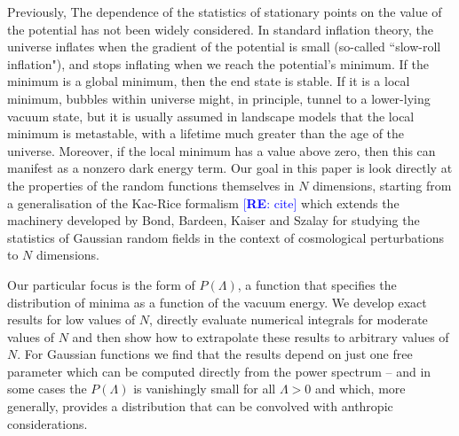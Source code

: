 \documentclass[12pt]{article}
\newcommand{\re}[1]{\textcolor{blue}{[{\bf RE}: #1]}}
\begin{document}




Previously, The dependence of the statistics of stationary points on the value of the potential has not been widely considered. In standard inflation theory, the universe inflates when the gradient of the potential is small (so-called ``slow-roll inflation"), and stops inflating when we reach the potential's minimum. If the minimum is a global minimum, then the end state is stable. If it is  a local minimum, bubbles within universe might, in principle,  tunnel to a lower-lying vacuum state, but it is usually assumed in landscape models that the local minimum is metastable, with a lifetime much greater than the age of the universe. Moreover, if the local minimum has a value above zero, then this can manifest as a nonzero dark energy term. Our goal in this paper is look directly at the properties of the random functions themselves in $N$ dimensions, starting from a generalisation of the Kac-Rice formalism \cite{Kac1943}\cite{Rice1945}\re{cite} which extends  the  machinery developed by Bond, Bardeen, Kaiser and Szalay for studying the statistics of Gaussian random fields in the context of cosmological perturbations to $N$ dimensions. 

Our particular focus is the form of $P(\Lambda)$, a function that specifies the distribution of minima as a function of the vacuum energy. We develop exact results for low values of $N$, directly evaluate numerical integrals for moderate values of $N$ and then show how to extrapolate these results to arbitrary values of $N$. For Gaussian functions we find that the results depend on just one free parameter which can be computed directly from the power spectrum -- and in some cases the $P(\Lambda)$ is vanishingly small for all  $\Lambda> 0$ and which, more generally, provides a distribution that can be convolved with anthropic considerations.  
\end{document}
